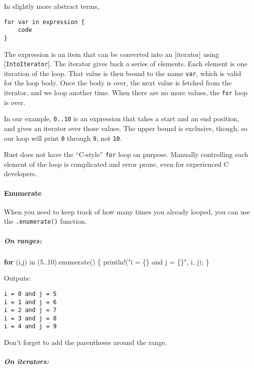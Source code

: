 \documentclass[a4paper,]{book}
\newenvironment{Shaded}{\begin{snugshade}}{\end{snugshade}}
\newcommand{\KeywordTok}[1]{\textcolor[rgb]{0.13,0.29,0.53}{\textbf{{#1}}}}
\newcommand{\DecValTok}[1]{\textcolor[rgb]{0.00,0.00,0.81}{{#1}}}
\newcommand{\StringTok}[1]{\textcolor[rgb]{0.31,0.60,0.02}{{#1}}}
\newcommand{\OtherTok}[1]{\textcolor[rgb]{0.56,0.35,0.01}{{#1}}}
\newcommand{\NormalTok}[1]{{#1}}
\let\oldparagraph\paragraph
\renewcommand{\paragraph}[1]{\oldparagraph{#1}\mbox{}}
\let\oldsubparagraph\subparagraph
\renewcommand{\subparagraph}[1]{\oldsubparagraph{#1}\mbox{}}
\begin{document}
In slightly more abstract terms,

\begin{verbatim}
for var in expression {
    code
}
\end{verbatim}

The expression is an item that can be converted into an {[}iterator{]}
using {[}\texttt{IntoIterator}{]}. The iterator gives back a series of
elements. Each element is one iteration of the loop. That value is then
bound to the name \texttt{var}, which is valid for the loop body. Once
the body is over, the next value is fetched from the iterator, and we
loop another time. When there are no more values, the \texttt{for} loop
is over.

In our example, \texttt{0..10} is an expression that takes a start and
an end position, and gives an iterator over those values. The upper
bound is exclusive, though, so our loop will print \texttt{0} through
\texttt{9}, not \texttt{10}.

Rust does not have the ``C-style'' \texttt{for} loop on purpose.
Manually controlling each element of the loop is complicated and error
prone, even for experienced C developers.

\paragraph{Enumerate}\label{enumerate}

When you need to keep track of how many times you already looped, you
can use the \texttt{.enumerate()} function.

\subparagraph{On ranges:}\label{on-ranges}

\begin{Shaded}
\begin{Highlighting}[]
\KeywordTok{for} \NormalTok{(i,j) in (}\DecValTok{5.}\NormalTok{.}\DecValTok{10}\NormalTok{).enumerate() \{}
    \OtherTok{println!}\NormalTok{(}\StringTok{"i = \{\} and j = \{\}"}\NormalTok{, i, j);}
\NormalTok{\}}
\end{Highlighting}
\end{Shaded}

Outputs:

\begin{verbatim}
i = 0 and j = 5
i = 1 and j = 6
i = 2 and j = 7
i = 3 and j = 8
i = 4 and j = 9
\end{verbatim}

Don't forget to add the parentheses around the range.

\subparagraph{On iterators:}\label{on-iterators}
\end{document}
